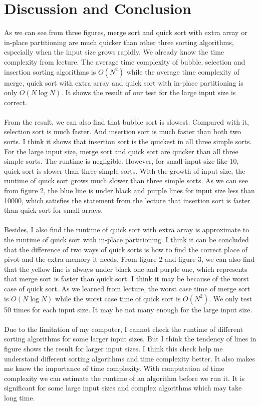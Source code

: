 \documentclass{article}
\begin{document}
\section{Discussion and Conclusion}
As we can see from three figures, merge sort and quick sort with extra array or in-place partitioning are much quicker than other three sorting algorithms, especially when the input size grows rapidly. We already know the time complexity from lecture. The average time complexity of bubble, selection and insertion sorting algorithms is $O(N^2)$ while the average time complexity of merge, quick sort with extra array and quick sort with in-place partitioning is only $O(N\log N)$. It shows the result of our test for the large input size is correct. \\
\\
From the result, we can also find that bubble sort is slowest. Compared with it, selection sort is much faster. And insertion sort is much faster than both two sorts. I think it shows that insertion sort is the quickest in all three simple sorts. For the large input size, merge sort and quick sort are quicker than all three simple sorts. The runtime is negligible. However, for small input size like 10, quick sort is slower than three simple sorts. With the growth of input size, the runtime of quick sort grows much slower than three simple sorts. As we can see from figure 2, the blue line is under black and purple lines for input size less than 10000, which satisfies the statement from the lecture that insertion sort is faster than quick sort for small arrays.\\
\\
Besides, I also find the runtime of quick sort with extra array is approximate to the runtime of quick sort with in-place partitioning. I think it can be concluded that the difference of two ways of quick sorts is how to find the correct place of pivot and the extra memory it needs. From figure 2 and figure 3, we can also find that the yellow line is always under black one and purple one, which represents that merge sort is faster than quick sort. I think it may be because of the worst case of quick sort. As we learned from lecture, the worst case time of merge sort is $O(N\log N)$ while the worst case time of quick sort is $O(N^2)$. We only test 50 times for each input size. It may be not many enough for the large input size.\\
\\
Due to the limitation of my computer, I cannot check the runtime of different sorting algorithms for some larger input sizes. But I think the tendency of lines in figure shows the result for larger input sizes. I think this check help me understand different sorting algorithms and time complexity better. It also makes me know the importance of time complexity. With computation of time complexity we can estimate the runtime of an algorithm before we run it. It is significant for some large input sizes and complex algorithms which may take long time.\\
\end{document}
